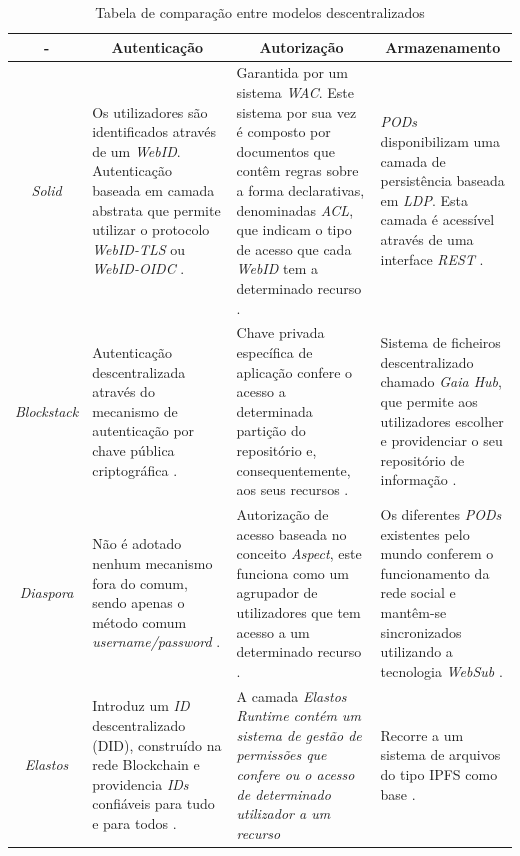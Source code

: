 \begin{center}
\small
\begin{longtable}{c|p{3.4cm}|p{3.4cm}|p{3.4cm}}
\caption{Tabela de comparação entre modelos descentralizados}
\label{tabela_comparacao_modelos_descentralizados}
\\
\toprule 
    \multicolumn{1}{c}{-} &
    \multicolumn{1}{c}{Autenticação} &
    \multicolumn{1}{c}{Autorização} &
    \multicolumn{1}{c}{Armazenamento}
    \\ \midrule\addlinespace[2pt] \endhead
\bottomrule\endfoot
\endlastfoot

\emph{Solid} & Os utilizadores são identificados através de um \emph{WebID}. Autenticação baseada em camada abstrata que permite utilizar o protocolo \emph{WebID-TLS} ou \emph{WebID-OIDC} \cite{solid_spec}. &  Garantida por um sistema \emph{\acrshort{WAC}}. Este sistema por sua vez é composto por documentos que contêm regras sobre a forma declarativas, denominadas \emph{\acrfull{ACL}}, que indicam o tipo de acesso que cada \emph{WebID} tem a determinado recurso \cite{solid_web_access_control}. & \emph{PODs} disponibilizam uma camada de persistência baseada em \emph{\acrshort{LDP}}. Esta camada é acessível através de uma interface \emph{\acrshort{REST}} \cite{solid_spec}. \\
\emph{Blockstack} & Autenticação descentralizada através do mecanismo de autenticação por chave pública criptográfica \cite{blockstack_white_paper}. & Chave privada específica de aplicação confere o acesso a determinada partição do repositório e, consequentemente, aos seus recursos \cite{blockstack_white_paper}. & Sistema de ficheiros descentralizado chamado \emph{Gaia Hub}, que permite aos utilizadores escolher e providenciar o seu repositório de informação \cite{blockstack_white_paper}. \\
\emph{Diaspora} & Não é adotado nenhum mecanismo fora do comum, sendo apenas o método comum \emph{username/password} \cite{diaspora_wiki}. & Autorização de acesso baseada no conceito \emph{Aspect}, este funciona como um agrupador de utilizadores que tem acesso a um determinado recurso \cite{diaspora_wiki}. & Os diferentes \emph{PODs} existentes pelo mundo conferem o funcionamento da rede social e mantêm-se sincronizados utilizando a tecnologia \emph{WebSub} \cite{diaspora_wiki}. \\
\emph{Elastos} & Introduz um \emph{ID} descentralizado (\acrshort{DID}), construído na rede Blockchain e providencia \emph{IDs} confiáveis para tudo e para todos \cite{elastos_white_paper}. & A camada \emph{Elastos Runtime contém um sistema de gestão de permissões que confere ou o acesso de determinado utilizador a um recurso}\cite{elastos_white_paper} & Recorre a um sistema de arquivos do tipo \acrshort{IPFS} como base \cite{elastos_developer}.
\end{longtable}
\end{center}

